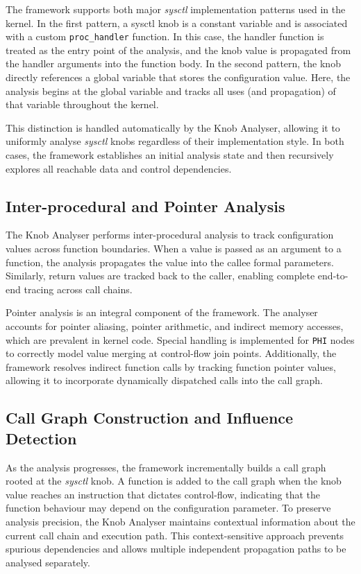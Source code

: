 The framework supports both major \textit{sysctl} implementation patterns used in the kernel.
In the first pattern, a sysctl knob is a constant variable and is associated with a custom \texttt{proc\_handler} function.
In this case, the handler function is treated as the entry point of the analysis, and the knob value is propagated from the handler arguments into the function body.
In the second pattern, the knob directly references a global variable that stores the configuration value.
Here, the analysis begins at the global variable and tracks all uses (and propagation) of that variable throughout the kernel.

This distinction is handled automatically by the Knob Analyser, allowing it to uniformly analyse \textit{sysctl} knobs regardless of their implementation style.
In both cases, the framework establishes an initial analysis state and then recursively explores all reachable data and control dependencies.

\subsection{Inter-procedural and Pointer Analysis}

The Knob Analyser performs inter-procedural analysis to track configuration values across function boundaries.
When a value is passed as an argument to a function, the analysis propagates the value into the callee formal parameters.
Similarly, return values are tracked back to the caller, enabling complete end-to-end tracing across call chains.

Pointer analysis is an integral component of the framework.
The analyser accounts for pointer aliasing, pointer arithmetic, and indirect memory accesses, which are prevalent in kernel code.
Special handling is implemented for \texttt{PHI} nodes to correctly model value merging at control-flow join points.
Additionally, the framework resolves indirect function calls by tracking function pointer values, allowing it to incorporate dynamically dispatched calls into the call graph.

\subsection{Call Graph Construction and Influence Detection}

As the analysis progresses, the framework incrementally builds a call graph rooted at the \textit{sysctl} knob.
A function is added to the call graph when the knob value reaches an instruction that dictates control-flow, indicating that the function behaviour may depend on the configuration parameter.
To preserve analysis precision, the Knob Analyser maintains contextual information about the current call chain and execution path.
This context-sensitive approach prevents spurious dependencies and allows multiple independent propagation paths to be analysed separately.

